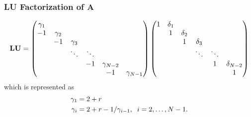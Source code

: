 \documentclass[11pt]{beamer}
\begin{document}
    \begin{frame}
        \frametitle{LU Factorization of A}
        \begin{equation}
        \resizebox{\textwidth}{!}{$\displaystyle
        \mathbf{LU} = \begin{pmatrix} \nonumber
        \gamma_1   \\
        -1  & \gamma_2  \\
        &  -1  & \gamma_3  \\
        &        & \ddots & \ddots \\
        &        &        &  -1 & \gamma_{N-2}  \\
        &        &        &          & -1 & \gamma_{N-1}  \\    
        \end{pmatrix}
        \begin{pmatrix}
        1  & \delta_1            \\
        & 1        & \delta_2 \\
        &          & 1        & \delta_3 \\
        &          &          &  \ddots & \ddots \\
        &          &          &         & 1     & \delta_{N-2} \\
        &          &          &         &       &  1
        \end{pmatrix}
        $}
        \end{equation}
        which is represented as
        \begin{align} \label{eqn:nonlinear2term}
        \gamma_1 &= 2+r  \nonumber \\ 
        \gamma_i &= 2+r-1/\gamma_{i-1},  \hspace{2mm} i=2, \dots ,N-1.
        \end{align}
    \end{frame}
\end{document}
